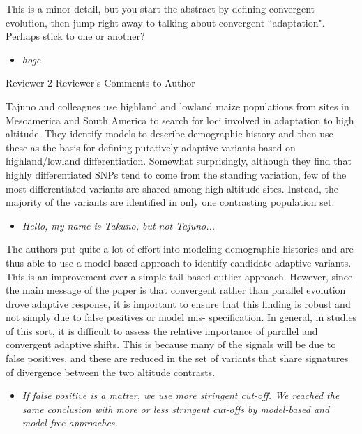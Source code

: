 \documentclass[onecolumn,oneside,letterpaper]{article}
\begin{document}
This is a minor detail, but you start the abstract by defining convergent evolution, then jump right away to talking about convergent ``adaptation".  Perhaps stick to one or another? 
\setlength{\parskip}{-5.0pt}
\begin{itemize}
\item \textit{ hoge }
\end{itemize}
\setlength{\parskip}{10.0pt}

Reviewer 2 Reviewer's Comments to Author

Tajuno and colleagues use highland and lowland maize populations from sites in Mesoamerica and South America to search for loci involved in adaptation to high altitude.  They identify models to describe demographic history and then use these as the basis for defining putatively adaptive variants based on highland/lowland differentiation.  Somewhat surprisingly, although they find that highly differentiated SNPs tend to come from the standing variation, few of the most differentiated variants are shared among high altitude sites. Instead, the majority of the variants are identified in only one contrasting population set.   
\setlength{\parskip}{-5.0pt}
\begin{itemize}
\item \textit{ Hello, my name is Takuno, but not Tajuno... }
\end{itemize}
\setlength{\parskip}{10.0pt}

The authors put quite a lot of effort into modeling demographic histories and are thus able to use a model-based approach to identify candidate adaptive variants.  This is an improvement over a simple tail-based outlier approach.  However, since the main message of the paper is that convergent rather than parallel evolution drove adaptive response, it is important to ensure that this finding is robust and not simply due to false positives or model mis- specification.  In general, in studies of this sort, it is difficult to assess the relative importance of parallel and convergent adaptive shifts. This is because many of the signals will be due to false positives, and these are reduced in the set of variants that share signatures of divergence between the two altitude contrasts.  
\setlength{\parskip}{-5.0pt}
\begin{itemize}
\item \textit{ If false positive is a matter, we use more stringent cut-off.   We reached the same conclusion with more or
 less stringent cut-offs by model-based and model-free approaches.  }
\end{itemize}
\setlength{\parskip}{10.0pt}
\end{document}
